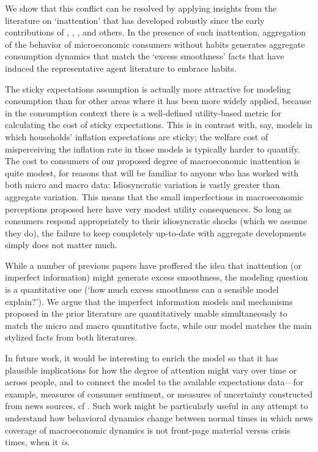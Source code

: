 We show that this conflict can be resolved by applying insights from the literature on `inattention' that has developed robustly since the early contributions of \cite{simsInattention}, \cite{woodfordImperfect}, \cite{mrSlumps}, and others.  In the presence of such inattention, aggregation of the behavior of microeconomic consumers without habits generates aggregate consumption dynamics that match the `excess smoothness' facts that have induced the representative agent literature to embrace habits.

The sticky expectations assumption is actually more attractive for modeling consumption than for other areas where it has been more widely applied, because in the consumption context there is a well-defined utility-based metric for calculating the cost of sticky expectations.  This is in contrast with, say, models in which households' inflation expectations are sticky; the welfare cost of misperceiving the inflation rate in those models is typically harder to quantify.  The cost to consumers of our proposed degree of macroeconomic inattention is quite modest, for reasons that will be familiar to anyone who has worked with both micro and macro data: Idiosyncratic variation is vastly greater than aggregate variation.  This means that the small imperfections in macroeconomic perceptions proposed here have very modest utility consequences.  So long as consumers respond appropriately to their idiosyncratic shocks (which we assume they do), the failure to keep completely up-to-date with aggregate developments simply does not matter much.

While a number of previous papers have proffered the idea that inattention (or imperfect information) might generate excess smoothness, the modeling question is a quantitative one (`how much excess smoothness can a sensible model explain?').  We argue that the imperfect information models and mechanisms proposed in the prior literature are quantitatively unable simultaneously to match the micro and macro quantitative facts, while our model matches the main stylized facts from both literatures.

In future work, it would be interesting to enrich the model so that it has plausible implications for how the degree of attention might vary over time or across people, and to connect the model to the available expectations data---for example, measures of consumer sentiment, or measures of uncertainty constructed from news sources, cf \cite{bbdUncertainty}.  Such work might be particularly useful in any attempt to understand how behavioral dynamics change between normal times in which news coverage of macroeconomic dynamics is not front-page material versus crisis times, when it {\it is}.


\processdelayedfloats

\small

\normalsize




